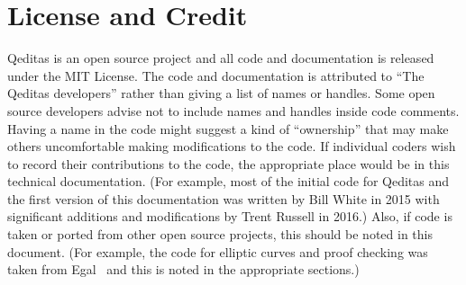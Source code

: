 \section{License and Credit}

Qeditas is an open source project and all code and documentation is released
under the MIT License. The code and documentation is attributed to
``The Qeditas developers'' rather than giving a list of names or handles.
Some open source developers advise not to include names and handles inside
code comments. Having a name in the code might suggest a kind of ``ownership''
that may make others uncomfortable making modifications to the code.
If individual coders wish to record their contributions to the
code, the appropriate place would be in this technical documentation.
(For example, most of the initial code for Qeditas and the
first version of this documentation was written
by Bill White in 2015 with significant additions and modifications by Trent Russell in 2016.)
Also, if code is taken or ported from other open source projects, this
should be noted in this document.
(For example, the code for elliptic curves and proof checking was taken from Egal~\cite{Brown2014}
and this is noted in the appropriate sections.)
